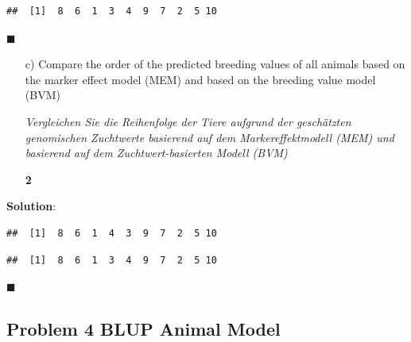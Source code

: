 \documentclass[
]{article}
\newenvironment{Shaded}{\begin{snugshade}}{\end{snugshade}}
\newcommand{\AttributeTok}[1]{\textcolor[rgb]{0.77,0.63,0.00}{#1}}
\newcommand{\ConstantTok}[1]{\textcolor[rgb]{0.00,0.00,0.00}{#1}}
\newcommand{\FunctionTok}[1]{\textcolor[rgb]{0.00,0.00,0.00}{#1}}
\newcommand{\NormalTok}[1]{#1}
\newcommand{\SpecialCharTok}[1]{\textcolor[rgb]{0.00,0.00,0.00}{#1}}
\newcommand{\StringTok}[1]{\textcolor[rgb]{0.31,0.60,0.02}{#1}}
\newcommand{\points}[1]
{\begin{flushright}\textbf{#1}\end{flushright}}
\newcommand{\solstart}
{\vspace{3ex}\textbf{Solution}:}
\newcommand{\solend}
{\vspace{2ex}$\blacksquare$}
\begin{document}
\begin{verbatim}
##  [1]  8  6  1  3  4  9  7  2  5 10
\end{verbatim}

\solend

\clearpage
\pagebreak

\vspace{3ex}
\begin{enumerate}
\item[c)]  Compare the order of the predicted breeding values of all animals based on the marker effect model (MEM) and based on the breeding value model (BVM)

\textit{Vergleichen Sie die Reihenfolge der Tiere aufgrund der geschätzten genomischen Zuchtwerte basierend auf dem Markereffektmodell (MEM) und basierend auf dem Zuchtwert-basierten Modell (BVM)}
\points{2}
\end{enumerate}

\solstart

\begin{Shaded}
\end{Shaded}

\begin{verbatim}
##  [1]  8  6  1  4  3  9  7  2  5 10
\end{verbatim}

\begin{Shaded}
\end{Shaded}

\begin{verbatim}
##  [1]  8  6  1  3  4  9  7  2  5 10
\end{verbatim}

\solend

\clearpage
\pagebreak

\hypertarget{problem-4-blup-animal-model}{%
\subsection{Problem 4 BLUP Animal
Model}\label{problem-4-blup-animal-model}}
\end{document}
